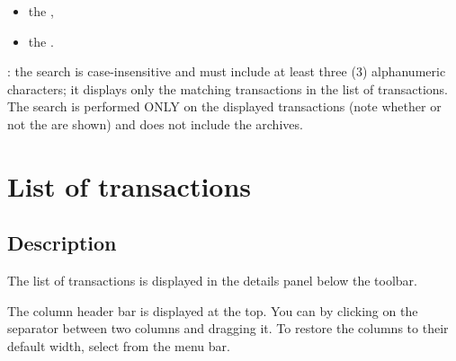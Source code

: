 \begin{itemize}
\begin{itemize}
			\item the ,
			\item the .
		\end{itemize}
		\Note{}: the search is case-insensitive and must include at least three (3) alphanumeric characters; it displays only the matching transactions in the list of transactions. The search is performed ONLY on the displayed transactions (note whether or not the  are shown) and does not include the archives.
\end{itemize}


\section{List of transactions\label{transactions-list}}


\subsection{Description\label{transactions-list-description}}

The list of transactions is displayed in the details panel below the toolbar.

The column header bar is displayed at the top. You can  by clicking on the separator between two columns and dragging it. To restore the columns to their default width, select  from the menu bar.

